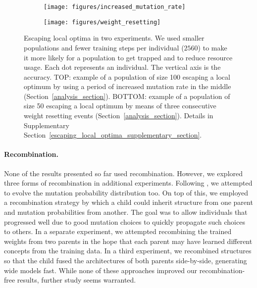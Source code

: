 \documentclass{article}
\begin{document}
\begin{figure}
    \vskip 0.2in
    \begin{centering}
        \begin{subfigure}[b]{1.0\columnwidth}
            \begin{centering}
                \centerline{\texttt{[image: figures/increased\_mutation\_rate]}}
            \end{centering}
        \end{subfigure}
        \begin{subfigure}[b]{1.0\columnwidth}
            \begin{centering}
                \centerline{\texttt{[image: figures/weight\_resetting]}}
            \end{centering}
        \end{subfigure}
        \caption{Escaping local optima in two experiments. We used smaller populations and fewer training steps per individual ($2560$) to make it more likely for a population to get trapped and to reduce resource usage. Each dot represents an individual. The vertical axis is the accuracy. TOP: example of a population of size 100 escaping a local optimum by using a period of increased mutation rate in the middle (Section~\ref{analysis_section}). BOTTOM: example of a population of size 50 escaping a local optimum by means of three consecutive weight resetting events (Section~\ref{analysis_section}). Details in Supplementary Section~\ref{escaping_local_optima_supplementary_section}.}
        \label{escape_figure}
    \end{centering}
    \vskip 0.2in
\end{figure}

\vspace{-1em}
\paragraph{Recombination.} None of the results presented so far used recombination. However, we explored three forms of recombination in additional experiments. Following \citet{tuson1998adapting}, we attempted to evolve the mutation probability distribution too. On top of this, we employed a recombination strategy by which a child could inherit structure from one parent and mutation probabilities from another. The goal was to allow individuals that progressed well due to good mutation choices to quickly propagate such choices to others. In a separate experiment, we attempted recombining the trained weights from two parents in the hope that each parent may have learned different concepts from the training data. In a third experiment, we recombined structures so that the child fused the architectures of both parents side-by-side, generating wide models fast. While none of these approaches improved our recombination-free results, further study seems warranted.
\end{document}
